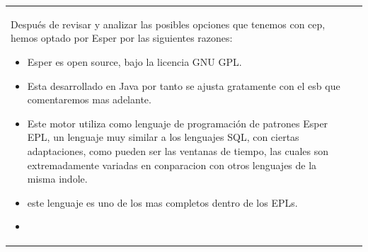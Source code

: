 \documentclass[a4paper]{article}
\begin{document}
\begin{center}
\begin{supertabular}{m{5.605cm}m{10.849cm}}
{      Después de revisar y analizar las posibles opciones que tenemos con cep, hemos optado por Esper por las siguientes razones:
      \begin{itemize}
      \item Esper es open source, bajo la licencia GNU GPL.
      \item Esta desarrollado en Java por tanto se ajusta gratamente con el esb que comentaremos mas adelante.
      \item Este motor utiliza como lenguaje de programación de patrones Esper EPL, un lenguaje muy similar a los lenguajes SQL, con ciertas adaptaciones, como pueden ser las ventanas de tiempo, las cuales son extremadamente variadas en conparacion con otros lenguajes de la misma indole.
      \item este lenguaje es uno de los mas completos dentro de los EPLs.
      \item 
      \end{itemize}
      
}
\end{supertabular}
\end{center}
\end{document}
